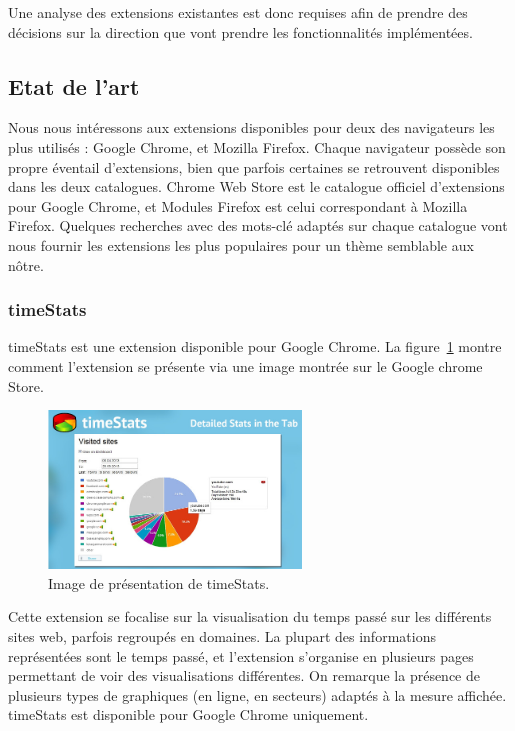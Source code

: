 		Une analyse des extensions existantes est donc requises afin de prendre des décisions sur la direction que vont prendre les fonctionnalités implémentées.

	\subsection{Etat de l'art}

		Nous nous intéressons aux extensions disponibles pour deux des navigateurs les plus utilisés : Google Chrome, et Mozilla Firefox. Chaque navigateur possède son propre éventail d'extensions, bien que parfois certaines se retrouvent disponibles dans les deux catalogues. Chrome Web Store\cite{chromewebstore} est le catalogue officiel d'extensions pour Google Chrome, et Modules Firefox\cite{modulesfirefox} est celui correspondant à Mozilla Firefox. Quelques recherches avec des mots-clé adaptés sur chaque catalogue vont nous fournir les extensions les plus populaires pour un thème semblable aux nôtre.

		\subsubsection{timeStats}

			timeStats\cite{timestats} est une extension disponible pour Google Chrome. La figure~\ref{a-timestats} montre comment l'extension se présente via une image montrée sur le Google chrome Store.

			\begin{figure}[h]
				\centering
				\includegraphics[width=0.6\textwidth]{images/analysis/timestats}
				\caption{Image de présentation de timeStats\cite{timestats}.}
				\label{a-timestats}
			\end{figure}

			Cette extension se focalise sur la visualisation du temps passé sur les différents sites web, parfois regroupés en domaines. La plupart des informations représentées sont le temps passé, et l'extension s'organise en plusieurs pages permettant de voir des visualisations différentes. On remarque la présence de plusieurs types de graphiques (en ligne, en secteurs) adaptés à la mesure affichée. timeStats est disponible pour Google Chrome uniquement.

